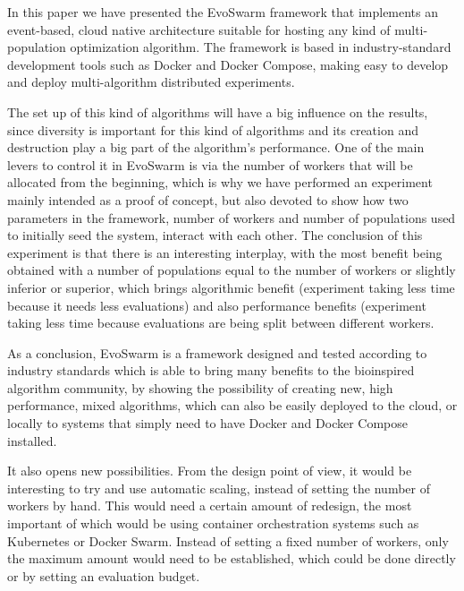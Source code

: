 \documentclass[review]{elsarticle}
\begin{document}
In this paper we have presented the EvoSwarm framework that implements
an event-based, cloud native architecture suitable for hosting any
kind of multi-population optimization algorithm. The framework is
based in industry-standard development tools such as Docker and Docker
Compose, making easy to develop and deploy multi-algorithm distributed
experiments.

The set up of this kind of algorithms will have a big influence on the
results, since diversity is important for this kind of algorithms and
its creation and destruction play a big part of the algorithm's
performance. One of the main levers to control it in EvoSwarm is via
the number of workers that will be allocated from the beginning, which
is why we have performed an experiment mainly intended as a proof of
concept, but also devoted to show how two parameters in the framework,
number of workers and number of populations used to initially seed the
system, interact with each other. The conclusion of this experiment is
that there is an interesting interplay, with the most benefit being
obtained with a number of populations equal to the number of workers
or slightly inferior or superior, which brings algorithmic benefit
(experiment taking less time because it needs less evaluations) and
also performance benefits (experiment taking less time because
evaluations are being split between different workers.

As a conclusion, EvoSwarm is a framework designed and tested according
to industry standards which is able to bring many benefits to the
bioinspired algorithm community, by showing the possibility of
creating new, high performance, mixed algorithms, which can also be
easily deployed to the cloud, or locally to systems that simply need
to have Docker and Docker Compose installed.

It also opens new possibilities. From the design point of view, it
would be interesting to try and use automatic scaling, instead of
setting the number of workers by hand. This would need a certain
amount of redesign, the most important of which would be using
container orchestration systems such as Kubernetes or Docker
Swarm. Instead of setting a fixed number of workers, only the maximum
amount would need to be established, which could be done directly or
by setting an evaluation budget.
\end{document}
